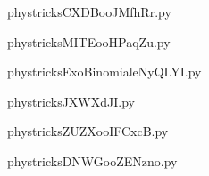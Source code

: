     \newcommand{\CaptionFigCXDBooJMfhRr}{<+Type your caption here+>}
    \begin{center}
        
    \end{center}
    phystricksCXDBooJMfhRr.py

    

    \clearpage
    


    \newcommand{\CaptionFigMITEooHPaqZu}{<+Type your caption here+>}
    \begin{center}
        
    \end{center}
    phystricksMITEooHPaqZu.py

    

    \clearpage
    


    \newcommand{\CaptionFigExoBinomialeNyQLYI}{<+Type your caption here+>}
    \begin{center}
        
    \end{center}
    phystricksExoBinomialeNyQLYI.py

    

    \clearpage
    


    \newcommand{\CaptionFigJXWXdJI}{<+Type your caption here+>}
    \begin{center}
        
    \end{center}
    phystricksJXWXdJI.py

    

    \clearpage
    


    \newcommand{\CaptionFigZUZXooIFCxcB}{<+Type your caption here+>}
    \begin{center}
        
    \end{center}
    phystricksZUZXooIFCxcB.py

    

    \clearpage
    


    \newcommand{\CaptionFigDNWGooZENzno}{<+Type your caption here+>}
    \begin{center}
        
    \end{center}
    phystricksDNWGooZENzno.py

